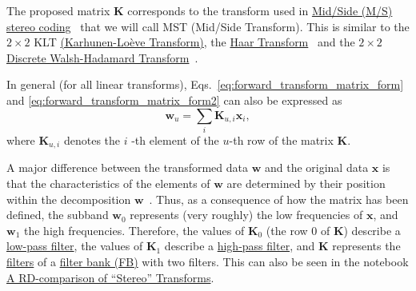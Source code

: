 The proposed matrix ${\mathbf K}$ corresponds to the transform used in
\href{https://en.wikipedia.org/wiki/Joint_encoding#M/S_stereo_coding}{Mid/Side
  (M/S) stereo coding}~\cite{bosi2003intro} that we will call MST
(Mid/Side Transform). This is similar to the $2\times 2$ KLT
\href{https://en.wikipedia.org/wiki/Kosambi%E2%80%93Karhunen%E2%80%93Lo%C3%A8ve_theorem}{(Karhunen-Lo\`eve
  Transform)}, the
\href{http://wavelets.pybytes.com/wavelet/haar/}{Haar
  Transform}~\cite{vetterli1995wavelets} and the $2\times 2$
\href{https://en.wikipedia.org/wiki/Hadamard_transform}{Discrete
  Walsh-Hadamard Transform}~\cite{sayood2017introduction}.

In general (for all linear transforms),
Eqs.~\eqref{eq:forward_transform_matrix_form} and
\eqref{eq:forward_transform_matrix_form2} can also be expressed as
\begin{equation}
  {\mathbf w}_u = \sum_i {\mathbf K}_{u,i}{\mathbf x}_i,
  \label{eq:forward_transform_linear_combination_form}
\end{equation}
where ${\mathbf K}_{u,i}$ denotes the $i$ -th element of the $u$-th row of
the matrix ${\mathbf K}$.

A major difference between the transformed data ${\mathbf w}$ and the
original data ${\mathbf x}$ is that the characteristics of the
elements of ${\mathbf w}$ are determined by their position within the
decomposition ${\mathbf w}$~\cite{sayood2017introduction}. Thus, as a
consequence of how the matrix has been defined, the subband ${\mathbf
  w}_0$ represents (very roughly) the low frequencies of ${\mathbf
  x}$, and ${\mathbf w}_1$ the high frequencies. Therefore, the values
of ${\mathbf K}_0$ (the row 0 of ${\mathbf K}$) describe a
\href{https://en.wikipedia.org/wiki/Low-pass_filter}{low-pass filter},
the values of ${\mathbf K}_1$ describe a
\href{https://en.wikipedia.org/wiki/High-pass_filter}{high-pass
  filter}, and ${\mathbf K}$ represents the
\href{https://en.wikipedia.org/wiki/Digital_filter}{filters} of a
\href{https://en.wikipedia.org/wiki/Filter_bank}{filter bank (FB)} with two
filters. This can also be seen in the notebook
\href{https://github.com/Tecnologias-multimedia/Tecnologias-multimedia.github.io/blob/master/contents/transform_coding/stereo_transforms_RD.ipynb}{A RD-comparison of ``Stereo'' Transforms}.

